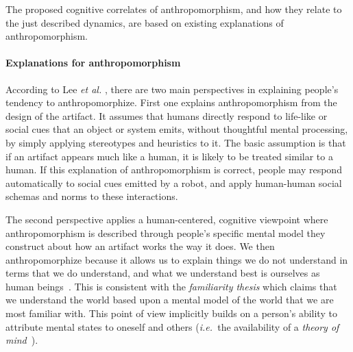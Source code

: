 \documentclass{sig-alternate-2013}
\newcommand{\ie}{{\textit{i.e.~}}}
\begin{document}
The proposed cognitive correlates of anthropomorphism, and how they relate to the just described dynamics, are based on existing explanations of anthropomorphism. 

\paragraph*{Explanations for anthropomorphism}


According to Lee \textit{et al.} \cite{lee_human_2005},
there are two main perspectives in explaining people's tendency to
anthropomorphize. First one explains anthropomorphism from the design of
the artifact. It assumes that humans
directly respond to life-like or social cues that an object or system emits,
without thoughtful mental processing, by simply applying stereotypes and
heuristics to it. 
The basic assumption is that if an artifact appears much like a
human, it is likely to be treated similar to a human. If this explanation of
anthropomorphism is correct, people may respond automatically to social cues
emitted by a robot, and apply human-human social schemas and norms to these
interactions.

The second perspective applies a human-centered, cognitive viewpoint where
anthropomorphism is described through people's specific mental model they
construct about how an artifact works the way it does.
We then anthropomorphize because it allows us to
explain things we do not understand in terms that we do understand, and what
we
 understand best is ourselves as human
beings~\cite{hegel_understanding_2008}. This is consistent with the
\emph{familiarity thesis} which claims that we
understand the world
 based upon a mental model of the world that we are most
familiar with.
 This point of view implicitly builds on a person's
ability to attribute
 mental states to oneself and others (\ie the availability
of a \emph{theory of
 mind}~\cite{premack1978does}). 
 
\end{document}
